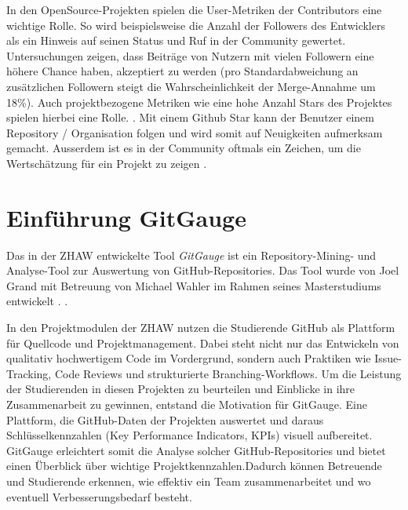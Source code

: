In den OpenSource-Projekten spielen die User-Metriken der Contributors eine wichtige Rolle. So wird beispielsweise die Anzahl der Followers des Entwicklers als ein Hinweis auf seinen Status und Ruf in der Community gewertet. Untersuchungen zeigen, dass Beiträge von Nutzern mit vielen Followern eine höhere Chance haben, akzeptiert zu werden (pro Standardabweichung an zusätzlichen Followern steigt die Wahrscheinlichkeit der Merge-Annahme um 18\%). Auch projektbezogene Metriken wie eine hohe Anzahl Stars des Projektes spielen hierbei eine Rolle. \parencite{tsay_influence_2014}. Mit einem Github Star kann der Benutzer einem Repository / Organisation folgen und wird somit auf Neuigkeiten aufmerksam gemacht. Ausserdem ist es in der Community oftmals ein Zeichen, um die Wertschätzung für ein Projekt zu zeigen \parencite{noauthor_saving_nodate}.

\section{Einführung GitGauge}
Das in der ZHAW entwickelte Tool \textit{GitGauge} ist ein Repository-Mining- und Analyse-Tool zur Auswertung von GitHub-Repositories. Das Tool wurde von Joel Grand mit Betreuung von Michael Wahler im Rahmen seines Masterstudiums entwickelt . \parencite{grand_joel_wahler_michael_waspe_lara_stumpf_simon_repo_nodate}.

In den Projektmodulen der ZHAW nutzen die Studierende GitHub als Plattform für Quellcode und Projektmanagement. Dabei steht nicht nur das Entwickeln von qualitativ hochwertigem Code im Vordergrund, sondern auch Praktiken wie Issue-Tracking, Code Reviews und strukturierte Branching-Workflows. Um die Leistung der Studierenden in diesen Projekten zu beurteilen und Einblicke in ihre Zusammenarbeit zu gewinnen, entstand die Motivation für GitGauge. Eine Plattform, die GitHub-Daten der Projekten auswertet und daraus Schlüsselkennzahlen (Key Performance Indicators, KPIs) visuell aufbereitet. GitGauge erleichtert somit die Analyse solcher GitHub-Repositories und bietet einen Überblick über wichtige Projektkennzahlen.Dadurch können Betreuende und Studierende erkennen, wie effektiv ein Team zusammenarbeitet und wo eventuell Verbesserungsbedarf besteht. \parencite{grand_joel_vt1_joelgrand_repository_2024}

